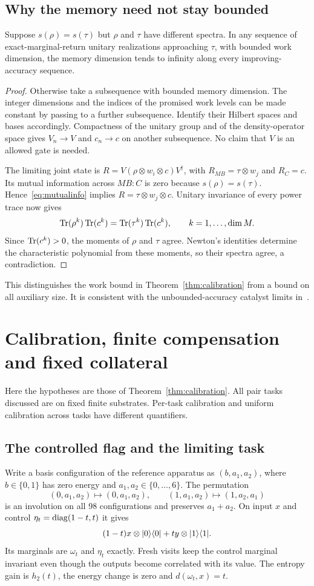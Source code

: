 \subsection{Why the memory need not stay bounded}
\begin{proposition}\label{prop:memory}
Suppose $s(\rho)=s(\tau)$ but $\rho$ and $\tau$ have different spectra. In any sequence of exact-marginal-return unitary realizations approaching $\tau$, with bounded work dimension, the memory dimension tends to infinity along every improving-accuracy sequence.
\end{proposition}
\begin{proof}
Otherwise take a subsequence with bounded memory dimension. The integer dimensions and the indices of the promised work levels can be made constant by passing to a further subsequence. Identify their Hilbert spaces and bases accordingly. Compactness of the unitary group and of the density-operator space gives $V_n\to V$ and $c_n\to c$ on another subsequence. No claim that $V$ is an allowed gate is needed.

The limiting joint state is $R=V(\rho\otimes w_i\otimes c)V^\dagger$, with $R_{MB}=\tau\otimes w_j$ and $R_C=c$. Its mutual information across $MB:C$ is zero because $s(\rho)=s(\tau)$. Hence~\eqref{eq:mutualinfo} implies $R=\tau\otimes w_j\otimes c$. Unitary invariance of every power trace now gives
\[
 \operatorname{Tr}(\rho^k)\operatorname{Tr}(c^k)=\operatorname{Tr}(\tau^k)\operatorname{Tr}(c^k),\qquad k=1,\ldots,\dim M.
\]
Since $\operatorname{Tr}(c^k)>0$, the moments of $\rho$ and $\tau$ agree. Newton's identities determine the characteristic polynomial from these moments, so their spectra agree, a contradiction.
\end{proof}
This distinguishes the work bound in Theorem~\ref{thm:calibration} from a bound on all auxiliary size. It is consistent with the unbounded-accuracy catalyst limits in~\cite{boes,wilming21,wilming22}.

\section{Calibration, finite compensation and fixed collateral}\label{app:calibration}
Here the hypotheses are those of Theorem~\ref{thm:calibration}. All pair tasks discussed are on fixed finite substrates. Per-task calibration and uniform calibration across tasks have different quantifiers.

\subsection{The controlled flag and the limiting task}
Write a basis configuration of the reference apparatus as $(b,a_1,a_2)$, where $b\in\{0,1\}$ has zero energy and $a_1,a_2\in\{0,\ldots,6\}$. The permutation
\[
 (0,a_1,a_2)\mapsto(0,a_1,a_2),\qquad
 (1,a_1,a_2)\mapsto(1,a_2,a_1)
\]
is an involution on all 98 configurations and preserves $a_1+a_2$. On input $x$ and control $\eta_t=\operatorname{diag}(1-t,t)$ it gives
\[
 (1-t)x\otimes\lvert 0\rangle\langle 0\rvert+ty\otimes\lvert 1\rangle\langle 1\rvert.
\]
Its marginals are $\omega_t$ and $\eta_t$ exactly. Fresh visits keep the control marginal invariant even though the outputs become correlated with its value. The entropy gain is $h_2(t)$, the energy change is zero and $d(\omega_t,x)=t$.

